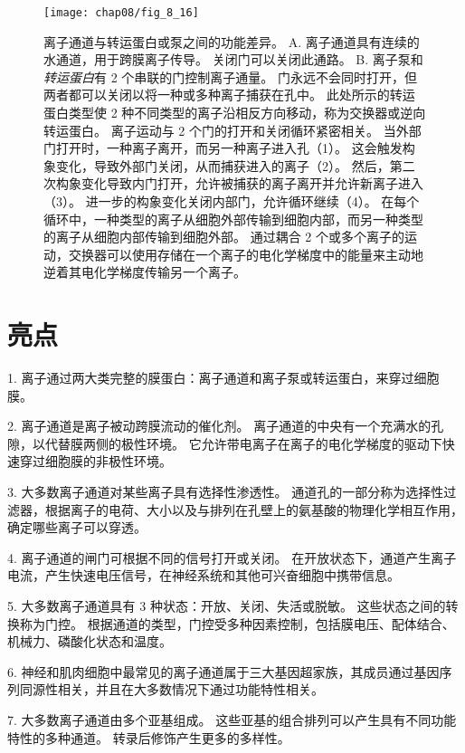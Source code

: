 \begin{figure}[htbp]
	\centering
	\texttt{[image: chap08/fig\_8\_16]}
	\caption{离子通道与转运蛋白或泵之间的功能差异\cite{gadsby2004spot}。 
		A. 离子通道具有连续的水通道，用于跨膜离子传导。
		关闭门可以关闭此通路。
		B. 离子泵和\textit{转运蛋白}有 2 个串联的门控制离子通量。
		门永远不会同时打开，但两者都可以关闭以将一种或多种离子捕获在孔中。
		此处所示的转运蛋白类型使 2 种不同类型的离子沿相反方向移动，称为交换器或逆向转运蛋白。
		离子运动与 2 个门的打开和关闭循环紧密相关。
		当外部门打开时，一种离子离开，而另一种离子进入孔（1）。
		这会触发构象变化，导致外部门关闭，从而捕获进入的离子（2）。
		然后，第二次构象变化导致内门打开，允许被捕获的离子离开并允许新离子进入（3）。
		进一步的构象变化关闭内部门，允许循环继续（4）。
		在每个循环中，一种类型的离子从细胞外部传输到细胞内部，而另一种类型的离子从细胞内部传输到细胞外部。
		通过耦合 2 个或多个离子的运动，交换器可以使用存储在一个离子的电化学梯度中的能量来主动地逆着其电化学梯度传输另一个离子。}
	\label{fig:8_16}
\end{figure}



\section{亮点}


1. 离子通过两大类完整的膜蛋白：离子通道和离子泵或转运蛋白，来穿过细胞膜。


2. 离子通道是离子被动跨膜流动的催化剂。
离子通道的中央有一个充满水的孔隙，以代替膜两侧的极性环境。
它允许带电离子在离子的电化学梯度的驱动下快速穿过细胞膜的非极性环境。


3. 大多数离子通道对某些离子具有选择性渗透性。
通道孔的一部分称为选择性过滤器，根据离子的电荷、大小以及与排列在孔壁上的氨基酸的物理化学相互作用，确定哪些离子可以穿透。


4. 离子通道的闸门可根据不同的信号打开或关闭。
在开放状态下，通道产生离子电流，产生快速电压信号，在神经系统和其他可兴奋细胞中携带信息。


5. 大多数离子通道具有 3 种状态：开放、关闭、失活或脱敏。
这些状态之间的转换称为门控。
根据通道的类型，门控受多种因素控制，包括膜电压、配体结合、机械力、磷酸化状态和温度。


6. 神经和肌肉细胞中最常见的离子通道属于三大基因超家族，其成员通过基因序列同源性相关，并且在大多数情况下通过功能特性相关。


7. 大多数离子通道由多个亚基组成。
这些亚基的组合排列可以产生具有不同功能特性的多种通道。
转录后修饰产生更多的多样性。


